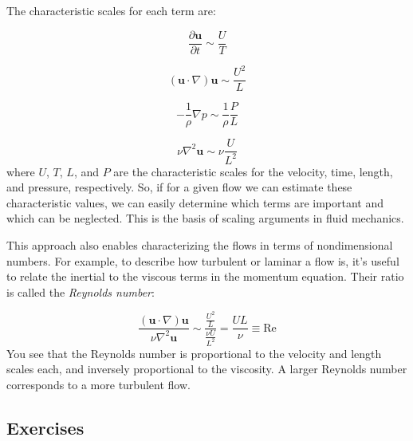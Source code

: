 \documentclass[12pt]{article}
\numberwithin{equation}{section}
\numberwithin{figure}{section}
\numberwithin{table}{section}
\begin{document}
The characteristic scales for each term are:

\begin{equation}
  \frac{\partial \mathbf{u}}{\partial t} \sim \frac{U}{T}
\end{equation}

\begin{equation}
  (\mathbf{u} \cdot \nabla) \mathbf{u} \sim \frac{U^2}{L}
\end{equation}

\begin{equation}
  - \frac{1}{\rho} \nabla p \sim \frac{1}{\rho} \frac{P}{L}
\end{equation}

\begin{equation}
  \nu \nabla^2 \mathbf{u} \sim \nu \frac{U}{L^2}
\end{equation}
where $U$, $T$, $L$, and $P$ are the characteristic scales for the velocity,
time, length, and pressure, respectively.
So, if for a given flow we can estimate these characteristic values, we can
easily determine which terms are important and which can be neglected.
This is the basis of scaling arguments in fluid mechanics.

This approach also enables characterizing the flows in terms of
nondimensional numbers.
For example, to describe how turbulent or laminar a flow is, it's useful to
relate the inertial to the viscous terms in the momentum equation.
Their ratio is called the  \textit{Reynolds number}:

\begin{equation}
  \frac{(\mathbf{u} \cdot \nabla) \mathbf{u}}{\nu \nabla^2 \mathbf{u}} \sim
  \frac{\frac{U^2}{L}}{\frac{\nu U}{L^2}} = \frac{UL}{\nu} \equiv \text{Re}
  \label{eq:reynolds_number}
\end{equation}
You see that the Reynolds number is proportional to the velocity and length
scales each, and inversely proportional to the viscosity.
A larger Reynolds number corresponds to a more turbulent flow.

\subsection*{Exercises}
\end{document}
